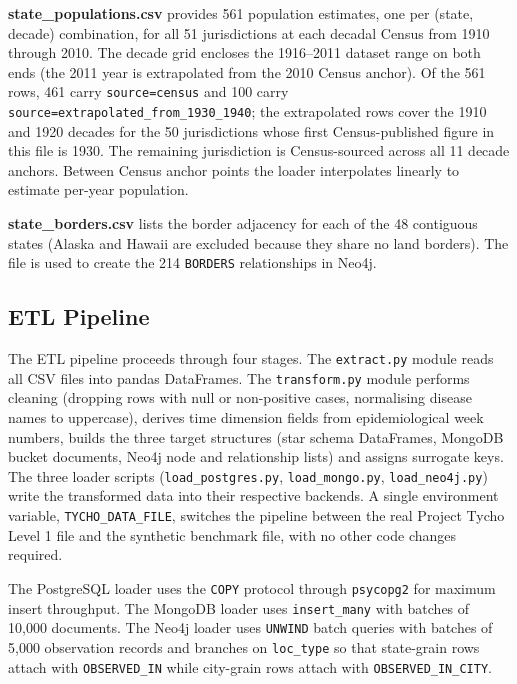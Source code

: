 \documentclass[12pt,a4paper]{article}
\begin{document}
\textbf{state\_populations.csv} provides 561 population estimates, one per (state, decade) combination, for all 51 jurisdictions at each decadal Census from 1910 through 2010. The decade grid encloses the 1916--2011 dataset range on both ends (the 2011 year is extrapolated from the 2010 Census anchor). Of the 561 rows, 461 carry \texttt{source=census} and 100 carry \texttt{source=extrapolated\_from\_1930\_1940}; the extrapolated rows cover the 1910 and 1920 decades for the 50 jurisdictions whose first Census-published figure in this file is 1930. The remaining jurisdiction is Census-sourced across all 11 decade anchors. Between Census anchor points the loader interpolates linearly to estimate per-year population.

\textbf{state\_borders.csv} lists the border adjacency for each of the 48 contiguous states (Alaska and Hawaii are excluded because they share no land borders). The file is used to create the 214 \texttt{BORDERS} relationships in Neo4j.

\subsection{ETL Pipeline}

The ETL pipeline proceeds through four stages. The \texttt{extract.py} module reads all CSV files into pandas DataFrames. The \texttt{transform.py} module performs cleaning (dropping rows with null or non-positive cases, normalising disease names to uppercase), derives time dimension fields from epidemiological week numbers, builds the three target structures (star schema DataFrames, MongoDB bucket documents, Neo4j node and relationship lists) and assigns surrogate keys. The three loader scripts (\texttt{load\_postgres.py}, \texttt{load\_mongo.py}, \texttt{load\_neo4j.py}) write the transformed data into their respective backends. A single environment variable, \texttt{TYCHO\_DATA\_FILE}, switches the pipeline between the real Project Tycho Level 1 file and the synthetic benchmark file, with no other code changes required.

The PostgreSQL loader uses the \texttt{COPY} protocol through \texttt{psycopg2} for maximum insert throughput. The MongoDB loader uses \texttt{insert\_many} with batches of 10{,}000 documents. The Neo4j loader uses \texttt{UNWIND} batch queries with batches of 5{,}000 observation records and branches on \texttt{loc\_type} so that state-grain rows attach with \texttt{OBSERVED\_IN} while city-grain rows attach with \texttt{OBSERVED\_IN\_CITY}.
\end{document}
